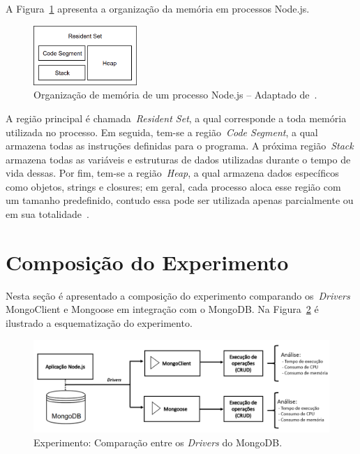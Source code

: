 \documentclass[12pt]{article}
\begin{document}
A Figura~\ref{figure:memoria} apresenta a organização da memória em processos Node.js.

\begin{figure}[!h]
    \centering
    \includegraphics[width=0.35\textwidth]{images/set}
    \caption{Organização de memória de um processo Node.js -- Adaptado de~\cite{nodememory}.} %
    \label{figure:memoria}
\end{figure}


A região principal é chamada~\emph{Resident Set}, a qual corresponde a toda memória utilizada no processo. Em seguida, tem-se a região~\emph{Code Segment}, a qual armazena todas as instruções definidas para o programa.
A próxima região~\emph{Stack} armazena todas as variáveis e estruturas de dados utilizadas durante o tempo de vida dessas. Por fim, tem-se a região~\emph{Heap}, a qual armazena dados específicos como objetos, strings e closures; em geral, cada processo aloca esse região com um tamanho predefinido, contudo essa pode ser utilizada apenas parcialmente ou em sua totalidade~\cite{nodememory}. 

\section{Composição do Experimento}
\label{section:experimento}

Nesta seção é apresentado a composição do experimento comparando os~\emph{Drivers} MongoClient e Mongoose em integração com o MongoDB. 
Na Figura~\ref{figure:diagrama-banco} é ilustrado a esquematização do experimento. 

\begin{figure}[!ht]
    \centering
    \includegraphics[width=\textwidth]{images/esquema-experimento.png}
    \caption{Experimento: Comparação entre os \emph{Drivers} do MongoDB.}
    \label{figure:diagrama-banco}
\end{figure}
\end{document}
